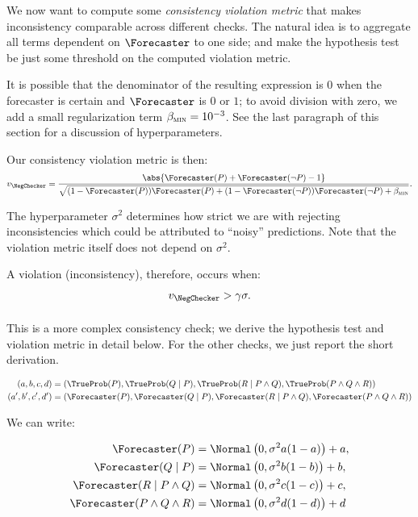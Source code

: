 We now want to compute some \emph{consistency violation metric} that makes inconsistency comparable across different checks. The natural idea is to aggregate all terms dependent on $\Forecaster$ to one side; and make the hypothesis test be just some threshold on the computed violation metric.

It is possible that the denominator of the resulting expression is $0$ when the forecaster is certain and $\Forecaster$ is $0$ or $1$; to avoid division with zero, we add a small regularization term $\beta_{\textsc{min}} = 10^{-3}$.
See the last paragraph of this section for a discussion of hyperparameters.

Our consistency violation metric is then:
\begin{align*}
    v_{\NegChecker}
    = \frac{\abs{\Forecaster(P) + \Forecaster(\neg P) - 1}}{\sqrt{(1 - \Forecaster(P)) \Forecaster(P) + (1 - \Forecaster(\neg P)) \Forecaster(\neg P) + \betamin}}.
\end{align*}

The hyperparameter $\sigma^2$ determines how strict we are with rejecting inconsistencies which could be attributed to ``noisy'' predictions. Note that the violation metric itself does not depend on $\sigma^2$.

A violation (inconsistency), therefore, occurs when:
\begin{align*}
    v_{\NegChecker} > \gamma \sigma.
\end{align*}

\paragraph{\CondCondChecker}
This is a more complex consistency check; we derive the hypothesis test and violation metric in detail below. For the other checks, we just report the short derivation.

\begin{align*}
(a, b, c, d) &= \left(\TrueProb(P), \TrueProb(Q \mid P), \TrueProb(R \mid P \wedge Q), \TrueProb(P \wedge Q \wedge R)\right) \\
(a', b', c', d') &= \left(\Forecaster(P), \Forecaster(Q \mid P), \Forecaster(R \mid P \wedge Q), \Forecaster(P \wedge Q \wedge R)\right)
\end{align*}

We can write:

\begin{align*}
    \Forecaster(P) &= \Normal\left(0, \sigma^2 a (1 - a)\right) + a, \\
    \Forecaster(Q\mid P) &= \Normal\left(0, \sigma^2 b (1 - b)\right) + b, \\
    \Forecaster(R \mid P \wedge Q) &= \Normal\left(0, \sigma^2 c (1 - c)\right) + c, \\
    \Forecaster(P \wedge Q \wedge R) &= \Normal\left(0, \sigma^2 d (1 - d)\right) + d
\end{align*}

